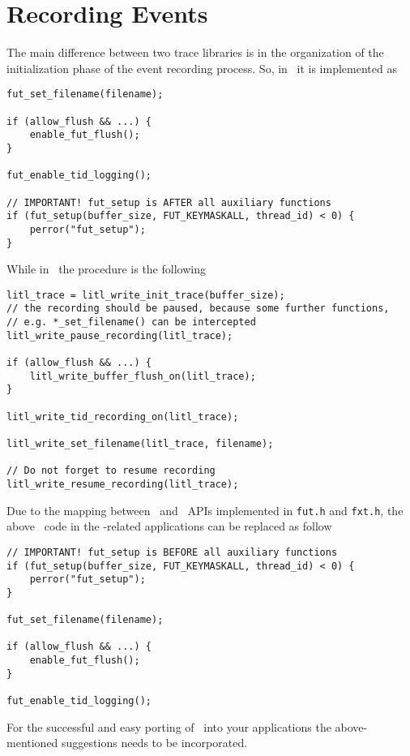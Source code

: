 \section{Recording Events}
The main difference between two trace libraries is in the organization of the
initialization phase of the event recording process. So, in \fxt\ it is 
implemented as
\begin{lstlisting}
fut_set_filename(filename);

if (allow_flush && ...) {
    enable_fut_flush();
}

fut_enable_tid_logging();

// IMPORTANT! fut_setup is AFTER all auxiliary functions
if (fut_setup(buffer_size, FUT_KEYMASKALL, thread_id) < 0) {
    perror("fut_setup");
}
\end{lstlisting}
While in \litl\ the procedure is the following
\begin{lstlisting}
litl_trace = litl_write_init_trace(buffer_size);
// the recording should be paused, because some further functions, 
// e.g. *_set_filename() can be intercepted
litl_write_pause_recording(litl_trace);

if (allow_flush && ...) {
    litl_write_buffer_flush_on(litl_trace);
}

litl_write_tid_recording_on(litl_trace);

litl_write_set_filename(litl_trace, filename);

// Do not forget to resume recording
litl_write_resume_recording(litl_trace);
\end{lstlisting}

Due to the mapping between \litl\ and \fxt\ APIs implemented in 
\texttt{fut.h} and \texttt{fxt.h}, the above \litl\ code in the \fxt-related 
applications can be replaced as follow
\begin{lstlisting}
// IMPORTANT! fut_setup is BEFORE all auxiliary functions
if (fut_setup(buffer_size, FUT_KEYMASKALL, thread_id) < 0) {
    perror("fut_setup");
}

fut_set_filename(filename);

if (allow_flush && ...) {
    enable_fut_flush();
}

fut_enable_tid_logging();
\end{lstlisting}

For the successful and easy porting of \litl\ into your applications the 
above-mentioned suggestions needs to be incorporated.

